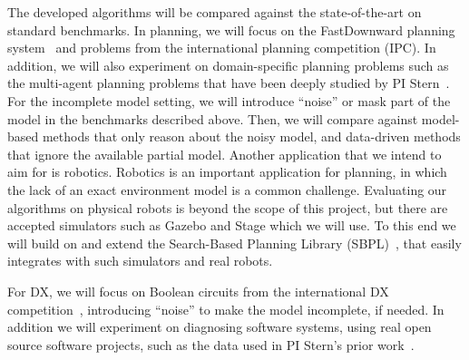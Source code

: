 \documentclass[12pt]{article}
\begin{document}
The developed algorithms will be compared against the state-of-the-art on standard benchmarks. In planning, 
we will focus on the FastDownward planning system~\cite{helmert2006fast} and problems from the international planning competition (IPC). 
In addition, we will also experiment on domain-specific planning problems such as the multi-agent planning problems that have been deeply studied by PI Stern~\cite{sharon2013increasing,sharon2015conflict,boyarski2015icbs,boyrasky2015dont,maliah2016collaborative}. 
For the incomplete model setting, we will introduce ``noise'' or mask part of the model in the benchmarks described above. Then, we will compare against model-based methods that only reason about the noisy model, and data-driven methods that ignore the available partial model. 
Another application that we intend to aim for is robotics. 
Robotics is an important application for planning, in which the lack of an exact environment model is a common challenge. Evaluating our algorithms on physical robots is beyond the scope of this project, but there are accepted simulators such as Gazebo and Stage which we will use. To this end we will build on and extend the Search-Based Planning Library (SBPL)~\cite{likhachev2014sbpl}, that easily integrates with such simulators and real robots. 

For DX, we will focus on Boolean circuits from the international DX competition~\cite{poll2011third}, introducing ``noise'' to make the model incomplete, if needed. In addition we will experiment on diagnosing software systems, using real open source software projects, such as the data used in PI Stern's prior work~\cite{Zamir2014UsingMD,elmishali2016dataAugmented,barIlan2017learningSoftwareBehavior}. 

\end{document}
